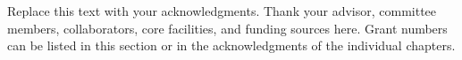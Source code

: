 
Replace this text with your acknowledgments. Thank your advisor, committee members, collaborators, core facilities, and funding sources here. Grant numbers can be listed in this section or in the acknowledgments of the individual chapters.
